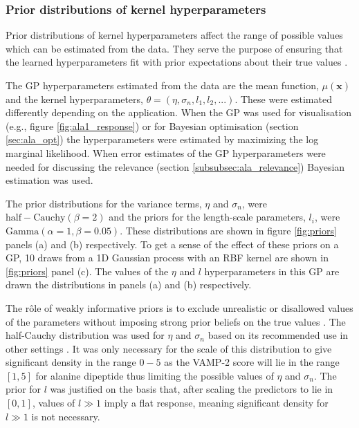 \subsubsection{Prior distributions of kernel hyperparameters}

Prior distributions of kernel hyperparameters affect the range of possible values  which can be estimated from the data. They serve the purpose of ensuring that the learned hyperparameters fit with prior expectations about their true values \cite{gelmanBayesianDataAnalysis2014}. 

The GP hyperparameters estimated from the data are the mean function, $\mu(\mathbf{x})$ and the kernel hyperparameters, $\theta = (\eta, \sigma_{n}, l_{1}, l_{2}, ...)$. These were estimated differently depending on the application. When the GP was used for visualisation (e.g., figure \ref{fig:ala1_response}) or for Bayesian optimisation (section \ref{sec:ala_opt}) the hyperparameters were estimated by maximizing the log marginal likelihood. When error estimates of the GP hyperparameters were needed for discussing the relevance (section \ref{subsubsec:ala_relevance}) Bayesian estimation was used. 

The prior distributions for the variance terms, $\eta$ and $\sigma_{n}$, were $\mathrm{half-Cauchy}(\beta=2)$ and the priors for the length-scale parameters, $l_{i}$, were $\mathrm{Gamma}(\alpha=1, \beta=0.05)$. These distributions are shown in figure \ref{fig:priors} panels (a) and (b) respectively.  To get a sense of the effect of these priors on a GP, 10 draws from a 1D Gaussian process with an RBF kernel are shown in  \ref{fig:priors} panel (c). The values of the $\eta$ and $l$ hyperparameters in this GP are drawn the distributions in panels (a) and (b) respectively.  

The r\^ole of weakly informative priors is to exclude unrealistic or disallowed values of the parameters without imposing strong prior beliefs on the true values \cite{gelmanBayesianDataAnalysis2014}. The half-Cauchy distribution  was used for $\eta$ and $\sigma_n$  based on its recommended use in other settings \cite{polsonHalfCauchyPriorGlobal2012}. It was only necessary for the scale of this distribution to give significant density in the range $0-5$ as the VAMP-2 score will lie in the range $[1,5]$ for alanine dipeptide thus limiting the possible values of $\eta$ and $\sigma_{n}$. The prior for $l$ was justified on the basis that, after scaling the predictors to lie in $[0, 1]$, values of $l \gg 1$ imply a flat response, meaning significant density for $l \gg 1$ is not necessary. 

